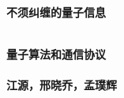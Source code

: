 \thispagestyle{empty}

\vspace{3cm}
  \begin{center}
	\bfseries \Huge 不须纠缠的量子信息 \par   %
        ~\\
	\bfseries \LARGE 量子算法和通信协议 \\   %
        ~\\
        \bfseries \Large 江源，邢晓乔，孟璞辉 \par   %

        \vspace{3cm}
    
    \end{center}
    
\par

\newpage